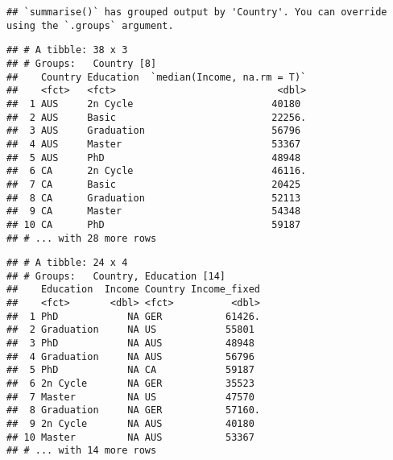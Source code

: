 \documentclass[]{article}
\newenvironment{Shaded}{\begin{snugshade}}{\end{snugshade}}
\newcommand{\CommentTok}[1]{\textcolor[rgb]{0.56,0.35,0.01}{\textit{#1}}}
\newcommand{\KeywordTok}[1]{\textcolor[rgb]{0.13,0.29,0.53}{\textbf{#1}}}
\newcommand{\NormalTok}[1]{#1}
\newcommand{\OperatorTok}[1]{\textcolor[rgb]{0.81,0.36,0.00}{\textbf{#1}}}
\newcommand{\StringTok}[1]{\textcolor[rgb]{0.31,0.60,0.02}{#1}}
\begin{document}
\begin{verbatim}
## `summarise()` has grouped output by 'Country'. You can override using the `.groups` argument.
\end{verbatim}

\begin{verbatim}
## # A tibble: 38 x 3
## # Groups:   Country [8]
##    Country Education  `median(Income, na.rm = T)`
##    <fct>   <fct>                            <dbl>
##  1 AUS     2n Cycle                        40180 
##  2 AUS     Basic                           22256.
##  3 AUS     Graduation                      56796 
##  4 AUS     Master                          53367 
##  5 AUS     PhD                             48948 
##  6 CA      2n Cycle                        46116.
##  7 CA      Basic                           20425 
##  8 CA      Graduation                      52113 
##  9 CA      Master                          54348 
## 10 CA      PhD                             59187 
## # ... with 28 more rows
\end{verbatim}

\begin{Shaded}
\end{Shaded}

\begin{verbatim}
## # A tibble: 24 x 4
## # Groups:   Country, Education [14]
##    Education  Income Country Income_fixed
##    <fct>       <dbl> <fct>          <dbl>
##  1 PhD            NA GER           61426.
##  2 Graduation     NA US            55801 
##  3 PhD            NA AUS           48948 
##  4 Graduation     NA AUS           56796 
##  5 PhD            NA CA            59187 
##  6 2n Cycle       NA GER           35523 
##  7 Master         NA US            47570 
##  8 Graduation     NA GER           57160.
##  9 2n Cycle       NA AUS           40180 
## 10 Master         NA AUS           53367 
## # ... with 14 more rows
\end{verbatim}

\begin{Shaded}
\end{Shaded}
\end{document}
